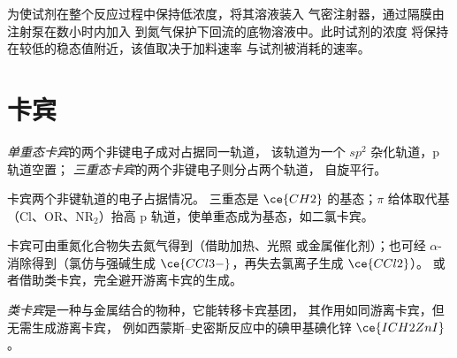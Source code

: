\begin{inthelab}[用注射泵缓慢加料]
为使试剂在整个反应过程中保持低浓度，将其溶液装入
气密注射器，通过隔膜由注射泵在数小时内加入
到氮气保护下回流的底物溶液中。此时试剂的浓度
将保持在较低的稳态值附近，该值取决于加料速率
与试剂被消耗的速率。
\end{inthelab}

\section{卡宾}

\begin{definition}[单重态与三重态卡宾]\label{def:b3:radicals-carbenes:carbene-states}
\emph{单重态卡宾}的两个非键电子成对占据同一轨道，
该轨道为一个 $sp^2$ 杂化轨道，p 轨道空置；
\emph{三重态卡宾}的两个非键电子则分占两个轨道，
自旋平行。
\end{definition}

\begin{omfigure}

{\small 卡宾两个非键轨道的电子占据情况。
三重态是 $\ce{CH2}$ 的基态；$\pi$ 给体取代基（Cl、OR、$\mathrm{NR_2}$）抬高
p 轨道，使单重态成为基态，如二氯卡宾。}
\end{omfigure}

卡宾可由重氮化合物失去氮气得到（借助加热、光照
或金属催化剂）；也可经 $\alpha$-消除得到（氯仿与强碱生成
$\ce{CCl3-}$，再失去氯离子生成 $\ce{CCl2}$）。
或者借助类卡宾，完全避开游离卡宾的生成。

\begin{definition}[类卡宾]\label{def:b3:radicals-carbenes:carbenoid}
\emph{类卡宾}是一种与金属结合的物种，它能转移卡宾基团，
其作用如同游离卡宾，但无需生成游离卡宾，
例如西蒙斯–史密斯反应中的碘甲基碘化锌 $\ce{ICH2ZnI}$。
\end{definition}

